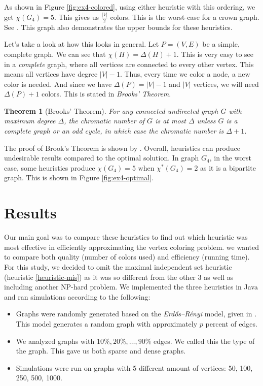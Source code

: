 \documentclass{article}
\newcounter{heuristic} \setcounter{heuristic}{0}
\newtheorem{theorem}{Theorem}
\theoremstyle{definition}
\begin{document}
\vspace{-0.3cm}

As shown in Figure \ref{fig:ex4-colored}, using either heuristic with this ordering, we get \(\chi(G_4) = 5\). This gives us \(\frac{|V|}{2}\) colors. This is the worst-case for a crown graph. See \citet{johnson}. This graph also demonstrates the upper bounds for these heuristics.

Let's take a look at how this looks in general. Let \(P = (V, E)\) be a simple, complete graph. We can see that \(\chi(H) = \Delta(H) + 1\). This is very easy to see in a \emph{complete} graph, where all vertices are connected to every other vertex. This means all vertices have degree \(|V| - 1\). Thus, every time we color a node, a new color is needed. And since we have \(\Delta(P) = |V| - 1\) and \(|V|\) vertices, we will need \(\Delta(P) + 1\) colors. This is stated in \emph{Brooks' Theorem}.

\begin{theorem}[Brooks' Theorem]
For any connected undirected graph \(G\) with maximum degree \(\Delta\), the chromatic number of \(G\) is at most \(\Delta\) unless \(G\) is a complete graph or an odd cycle, in which case the chromatic number is \(\Delta + 1\).
\end{theorem}

The proof of Brook's Theorem is shown by \citet{lovasz}. Overall, heuristics can produce undesirable results compared to the optimal solution. In graph \(G_4\), in the worst case, some heuristics produce \(\chi(G_4) = 5\) when \(\chi^{*}(G_4) = 2\) as it is a bipartite graph. This is shown in Figure \ref{fig:ex4-optimal}.

\vspace{-0.1cm}

\section{Results}
Our main goal was to compare these heuristics to find out which heuristic was most effective in efficiently approximating the vertex coloring problem. we wanted to compare both quality (number of colors used) and efficiency (running time). For this study, we decided to omit the maximal independent set heuristic (heuristic \ref{heuristic-mis}) as it was so different from the other 3 as well as including another NP-hard problem. We implemented the three heuristics in Java and ran simulations according to the following:
\begin{itemize}
  \setlength\itemsep{0.4em}
  \item Graphs were randomly generated based on the \emph{Erdős–Rényi} model, given in \citet{erdds1959random}. This model generates a random graph with approximately $p$ percent of edges.
  \item We analyzed graphs with $10\%, 20\%, \ldots, 90\%$ edges. We called this the type of the graph. This gave us both sparse and dense graphs.
  \item Simulations were run on graphs with 5 different amount of vertices: 50, 100, 250, 500, 1000.
\end{itemize}
\end{document}
